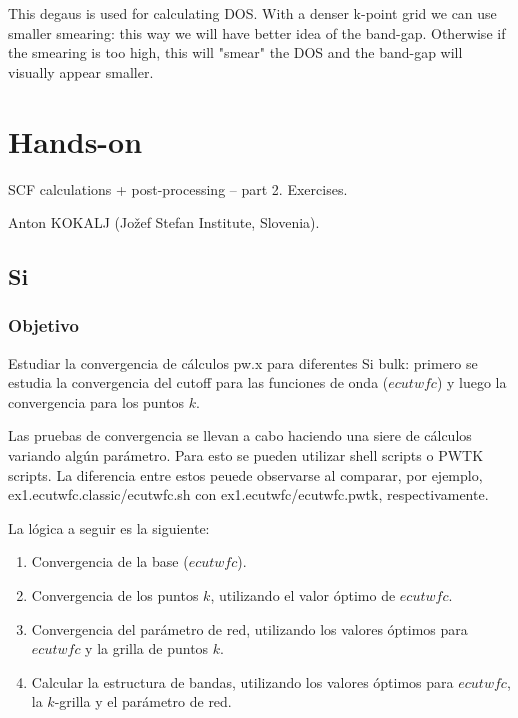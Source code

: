 
  This degaus is used for calculating DOS. With a denser k-point grid we can use smaller smearing: this way we will have better idea of the band-gap. Otherwise if the smearing is too high, this will "smear" the DOS and the band-gap will visually appear smaller.

\section{Hands-on}

     SCF calculations + post-processing – part 2. Exercises.

    	Anton KOKALJ (Jožef Stefan Institute, Slovenia).

\subsection{Si}

\subsubsection{Objetivo}

  Estudiar la convergencia de cálculos pw.x para diferentes Si bulk: primero se estudia la convergencia del cutoff para las funciones de onda ($ecutwfc$) y luego la convergencia para los puntos $k$.

  Las pruebas de convergencia se llevan a cabo haciendo una siere de cálculos variando algún parámetro. Para esto se pueden utilizar shell scripts o PWTK scripts. La diferencia entre estos peuede observarse al comparar, por ejemplo, ex1.ecutwfc.classic/ecutwfc.sh con ex1.ecutwfc/ecutwfc.pwtk, respectivamente.

  La lógica a seguir es la siguiente:
    \begin{enumerate}
      \item Convergencia de la base ($ecutwfc$).
      \item Convergencia de los puntos $k$, utilizando el valor óptimo de $ecutwfc$.
      \item Convergencia del parámetro de red, utilizando los valores óptimos para $ecutwfc$ y la grilla de puntos $k$.
      \item Calcular la estructura de bandas, utilizando los valores óptimos para $ecutwfc$, la $k$-grilla y el parámetro de red.
    \end{enumerate}

